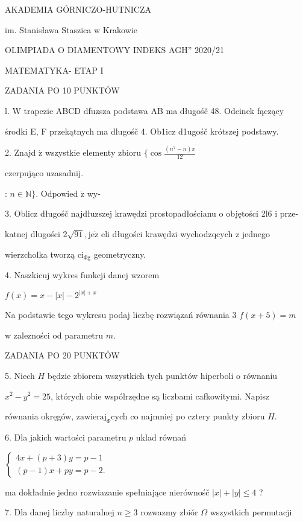 \documentclass[a4paper,12pt]{article}
\begin{document}
AKADEMIA GÓRNICZO-HUTNICZA

im. Stanisława Staszica w Krakowie

OLIMPIADA O DIAMENTOWY INDEKS AGH'' 2020/21

MATEMATYKA- ETAP I

ZADANIA PO 10 PUNKTÓW

l. W trapezie ABCD dfuzsza podstawa AB ma długośč 48. Odcinek fączący

środki E, F przekątnych ma dlugośč 4. Ob1icz d1ugośč krótszej podstawy.

2. Znajd $\acute{\mathrm{z}}$ wszystkie elementy zbioru $\displaystyle \{\cos\frac{(n^{7}-n)\pi}{12}$

czerpująco uzasadnij.

: $n\in \mathbb{N}\}.$ Odpowied $\acute{\mathrm{z}}$ wy-

3. Oblicz długośč najdłuzszej krawędzi prostopadłościanu o objętości 2l6 i prze-

katnej dlugości $2\sqrt{91}, \mathrm{j}\mathrm{e}\dot{\mathrm{z}}$ eli długości krawędzi wychodzqcych z jednego

wierzcholka tworzą $\mathrm{c}\mathrm{i}_{\Phi \mathrm{g}}$ geometryczny.

4. Naszkicuj wykres funkcji danej wzorem

$f(x)=x-|x|-2^{|x|+x}$

Na podstawie tego wykresu podaj liczbę rozwiązań równania 3 $f(x+5)=m$

w zalezności od parametru $m.$

ZADANIA PO 20 PUNKTÓW

5. Niech $H$ będzie zbiorem wszystkich tych punktów hiperboli o równaniu

$x^{2}-y^{2} = 25$, których obie wspólrzędne są liczbami cafkowitymi. Napisz

równania okręgów, $\mathrm{z}\mathrm{a}\mathrm{w}\mathrm{i}\mathrm{e}\mathrm{r}\mathrm{a}\mathrm{j}_{\Phi}$cych co najmniej po cztery punkty zbioru $H.$

6. Dla jakich wartości parametru $p$ uklad równań

$\left\{\begin{array}{l}
4x+(p+3)y=p-1\\
(p-1)x+py=p-2.
\end{array}\right.$

ma dokładnie jedno rozwiazanie spełniające nierównośč $|x|+|y|\leq 4$ ?

7. Dla danej liczby naturalnej $n\geq 3$ rozwazmy zbiór $\Omega$ wszystkich permutacji
\end{document}
